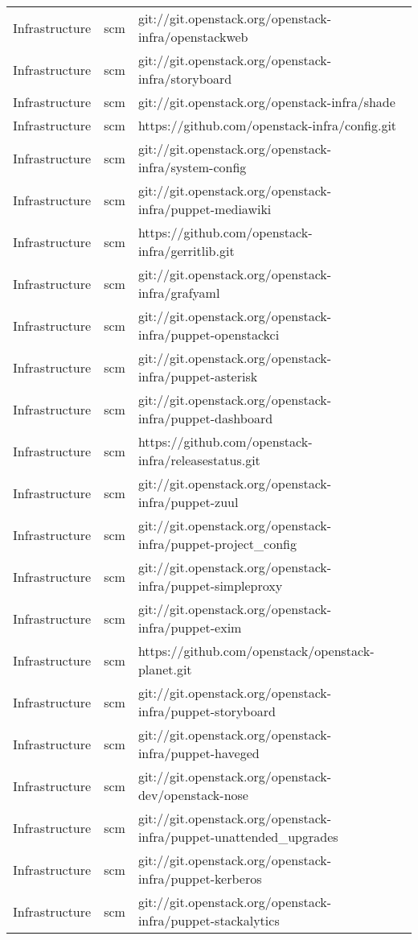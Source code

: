 \begin{center}
\begin{longtable}{|p{4cm}|p{1cm}|p{10cm}|}
Infrastructure&scm&git://git.openstack.org/openstack-infra/openstackweb\\ 
Infrastructure&scm&git://git.openstack.org/openstack-infra/storyboard\\ 
Infrastructure&scm&git://git.openstack.org/openstack-infra/shade\\ 
Infrastructure&scm&https://github.com/openstack-infra/config.git\\ 
Infrastructure&scm&git://git.openstack.org/openstack-infra/system-config\\ 
Infrastructure&scm&git://git.openstack.org/openstack-infra/puppet-mediawiki\\ 
Infrastructure&scm&https://github.com/openstack-infra/gerritlib.git\\ 
Infrastructure&scm&git://git.openstack.org/openstack-infra/grafyaml\\ 
Infrastructure&scm&git://git.openstack.org/openstack-infra/puppet-openstackci\\ 
Infrastructure&scm&git://git.openstack.org/openstack-infra/puppet-asterisk\\ 
Infrastructure&scm&git://git.openstack.org/openstack-infra/puppet-dashboard\\ 
Infrastructure&scm&https://github.com/openstack-infra/releasestatus.git\\ 
Infrastructure&scm&git://git.openstack.org/openstack-infra/puppet-zuul\\ 
Infrastructure&scm&git://git.openstack.org/openstack-infra/puppet-project\_config\\ 
Infrastructure&scm&git://git.openstack.org/openstack-infra/puppet-simpleproxy\\ 
Infrastructure&scm&git://git.openstack.org/openstack-infra/puppet-exim\\ 
Infrastructure&scm&https://github.com/openstack/openstack-planet.git\\ 
Infrastructure&scm&git://git.openstack.org/openstack-infra/puppet-storyboard\\ 
Infrastructure&scm&git://git.openstack.org/openstack-infra/puppet-haveged\\ 
Infrastructure&scm&git://git.openstack.org/openstack-dev/openstack-nose\\ 
Infrastructure&scm&git://git.openstack.org/openstack-infra/puppet-unattended\_upgrades\\ 
Infrastructure&scm&git://git.openstack.org/openstack-infra/puppet-kerberos\\ 
Infrastructure&scm&git://git.openstack.org/openstack-infra/puppet-stackalytics\\ 

\end{longtable}
\end{center}
